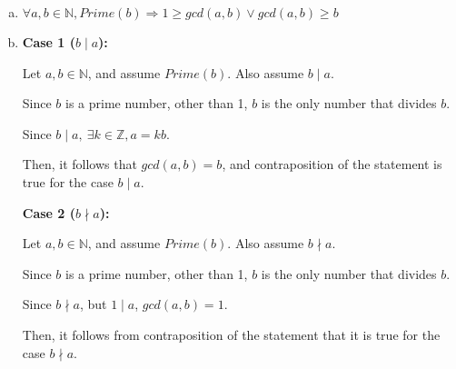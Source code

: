 \documentclass[12pt]{article}
\begin{document}
\begin{enumerate}[a.]
    \item

    $\forall a,b \in \mathbb{N}, Prime(b) \Rightarrow 1 \geq gcd(a,b) \lor gcd(a,b) \geq b$

    \item

    \textbf{Case 1 ($b \mid a$):}

    \bigskip

    Let $a,b \in \mathbb{N}$, and assume $Prime(b)$. Also assume $b \mid a$.

    \bigskip

    Since $b$ is a prime number, other than 1, $b$ is the only number that divides $b$.

    \bigskip

    Since $b \mid a,\:\exists k \in \mathbb{Z}, a = kb$.

    \bigskip

    Then, it follows that $gcd(a,b) = b$, and contraposition of the statement is true
    for the case $b \mid a$.

    \bigskip

    \textbf{Case 2 ($b \nmid a$):}

    \bigskip

    Let $a,b \in \mathbb{N}$, and assume $Prime(b)$. Also assume $b \nmid a$.

    \bigskip

    Since $b$ is a prime number, other than 1, $b$ is the only number that divides $b$.

    \bigskip

    Since $b \nmid a$, but $1 \mid a$, $gcd(a,b) = 1$.

    \bigskip

    Then, it follows from contraposition of the statement that it is true
    for the case $b \nmid a$.

\end{enumerate}
\end{document}
